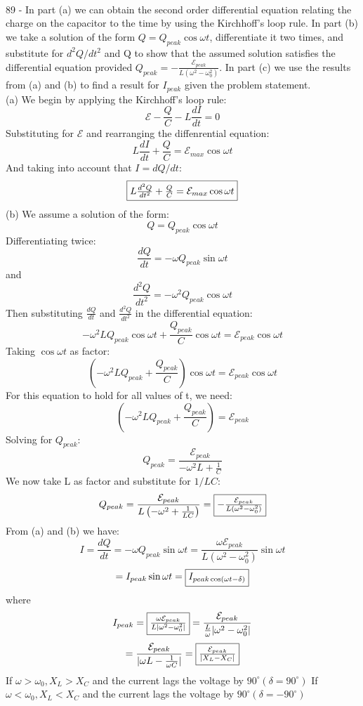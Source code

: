 \documentclass{report}
\begin{document}
\paragraph{}
89 - In part (a) we can obtain the second order differential equation relating the charge on the capacitor to the time by using the Kirchhoff's loop rule. In part (b) we take a solution of the form $Q = Q_{peak} \cos \omega t$, differentiate it two times, and substitute for $d^2Q / dt^2$ and Q to show that the assumed solution satisfies the differential equation provided $Q_{peak} = -\frac{\mathcal{E}_{peak}}{L(\omega^2 -\omega_0^2)}$. In part (c) we use the results from (a) and (b) to find a result for $I_{peak}$ given the problem statement.\\
(a) We begin by applying the Kirchhoff's loop rule:
$$\mathcal{E} - \frac{Q}{C} - L\frac{dI}{dt} = 0$$
Substituting for $\mathcal{E}$ and rearranging the diffenrential equation:
$$L\frac{dI}{dt} + \frac{Q}{C} = \mathcal{E}_{max} \cos \omega t$$
And taking into account that $I = dQ / dt$:
$$\fbox{$L\frac{d^2Q}{dt^2} + \frac{Q}{C} = \mathcal{E}_{max} \cos \omega t$}$$
(b) We assume a solution of the form:
$$Q = Q_{peak} \cos \omega t$$
Differentiating twice:
$$\frac{dQ}{dt} = -\omega Q_{peak} \sin \omega t$$
and
$$\frac{d^2Q}{dt^2} = -\omega^2 Q_{peak} \cos \omega t$$
Then substituting $\frac{dQ}{dt}$ and $\frac{d^2Q}{dt^2}$ in the differential equation:
$$-\omega^2LQ_{peak} \cos \omega t + \frac{Q_{peak}}{C} \cos \omega t = \mathcal{E}_{peak} \cos \omega t$$
Taking $\cos \omega t$ as factor:
$$\left( -\omega^2 LQ_{peak} + \frac{Q_{peak}}{C} \right) \cos \omega t = \mathcal{E}_{peak} \cos \omega t$$
For this equation to hold for all values of t, we need:
$$\left( -\omega^2 LQ_{peak} + \frac{Q_{peak}}{C} \right) = \mathcal{E}_{peak}$$
Solving for $Q_{peak}$:
$$Q_{peak} = \frac{\mathcal{E}_{peak}}{-\omega^2 L + \frac{1}{C}}$$
We now take L as factor and substitute for $1 / LC$:
$$Q_{peak} = \frac{\mathcal{E}_{peak}}{L\left( -\omega^2 + \frac{1}{LC} \right)} = \fbox{$-\frac{\mathcal{E}_{peak}}{L(\omega^2 - \omega_0^2)}$}$$
From (a) and (b) we have:
$$I = \frac{dQ}{dt} = -\omega Q_{peak} \sin \omega t = \frac{\omega \mathcal{E}_{peak}}{L(\omega^2 - \omega_0^2)} \sin \omega t$$
$$= I_{peak} \sin \omega t = \fbox{$I_{peak \cos (\omega t - \delta)}$}$$
where
$$I_{peak} = \fbox{$\frac{\omega \mathcal{E}_{peak}}{L\lvert \omega^2 - \omega_0^2 \rvert}$} = \frac{\mathcal{E}_{peak}}{\frac{L}{\omega}\lvert \omega^2 - \omega_0^2 \rvert}$$
$$= \frac{\mathcal{E}_{peak}}{\lvert \omega L - \frac{1}{\omega C} \rvert} = \fbox{$\frac{\mathcal{E}_{peak}}{\lvert X_L - X_C \rvert}$}$$
If $\omega > \omega_0, X_L > X_C$ and the current lags the voltage by $90^{\circ} (\delta = 90^{\circ})$
If $\omega < \omega_0, X_L < X_C$ and the current lags the voltage by $90^{\circ} (\delta = -90^{\circ})$
\end{document}
